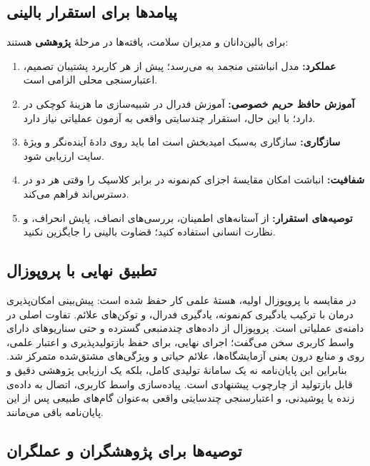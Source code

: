 \subsection{پیامدها برای استقرار بالینی}

برای بالین‌دانان و مدیران سلامت، یافته‌ها در مرحلۀ \textbf{پژوهشی} هستند:

\begin{enumerate}
\item \textbf{عملکرد:} مدل انباشتی منجمد به  \textbf{} می‌رسد؛ پیش از هر کاربرد پشتیبان تصمیم، اعتبارسنجی محلی الزامی است.
\item \textbf{آموزش حافظ حریم خصوصی:} آموزش فدرال در شبیه‌سازی ما هزینۀ کوچکی در  دارد؛ با این حال، استقرار چندسایتی واقعی به آزمون عملیاتی نیاز دارد.
\item \textbf{سازگاری:} سازگاری به‌سبک  امیدبخش است اما باید روی دادۀ آینده‌نگر و ویژۀ سایت ارزیابی شود.
\item \textbf{شفافیت:} انباشت امکان مقایسۀ اجزای کم‌نمونه در برابر کلاسیک را وقتی هر دو در دسترس‌اند فراهم می‌کند.
\item \textbf{توصیه‌های استقرار:} از آستانه‌های اطمینان، بررسی‌های انصاف، پایش انحراف، و نظارت انسانی استفاده کنید؛ قضاوت بالینی را جایگزین نکنید.
\end{enumerate}

\subsection{تطبیق نهایی با پروپوزال}

در مقایسه با پروپوزال اولیه، هستۀ علمی کار حفظ شده است: پیش‌بینی امکان‌پذیری درمان با ترکیب یادگیری کم‌نمونه، یادگیری فدرال،  و توکن‌های علائم. تفاوت اصلی در دامنه‌ی عملیاتی است. پروپوزال از داده‌های چندمنبعی گسترده و حتی سناریوهای دارای واسط کاربری سخن می‌گفت؛ اجرای نهایی، برای حفظ بازتولیدپذیری و اعتبار علمی، روی  و منابع درون  یعنی آزمایشگاه‌ها، علائم حیاتی و ویژگی‌های مشتق‌شده متمرکز شد. بنابراین این پایان‌نامه نه یک سامانۀ تولیدی کامل، بلکه یک ارزیابی پژوهشی دقیق و قابل بازتولید از چارچوب پیشنهادی است. پیاده‌سازی واسط کاربری، اتصال به داده‌ی زنده یا پوشیدنی، و اعتبارسنجی چندسایتی واقعی به‌عنوان گام‌های طبیعی پس از این پایان‌نامه باقی می‌مانند.

\subsection{توصیه‌ها برای پژوهشگران و عملگران}

